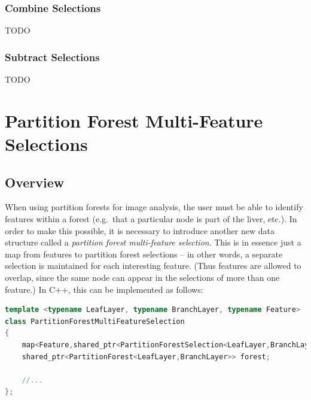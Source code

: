 \subsubsection{Combine Selections}

TODO

\subsubsection{Subtract Selections}

TODO

\newpage

\section{Partition Forest Multi-Feature Selections}

\subsection{Overview}

When using partition forests for image analysis, the user must be able to identify features within a forest (e.g.~that a particular node is part of the liver, etc.). In order to make this possible, it is necessary to introduce another new data structure called a \emph{partition forest multi-feature selection}. This is in essence just a map from features to partition forest selections -- in other words, a separate selection is maintained for each interesting feature. (Thus features are allowed to overlap, since the same node can appear in the selections of more than one feature.) In C++, this can be implemented as follows:

\begin{lstlisting}[style=Default,language=C++]
template <typename LeafLayer, typename BranchLayer, typename Feature>
class PartitionForestMultiFeatureSelection
{
	map<Feature,shared_ptr<PartitionForestSelection<LeafLayer,BranchLayer>>> selections;
	shared_ptr<PartitionForest<LeafLayer,BranchLayer>> forest;

	//...
};
\end{lstlisting}

